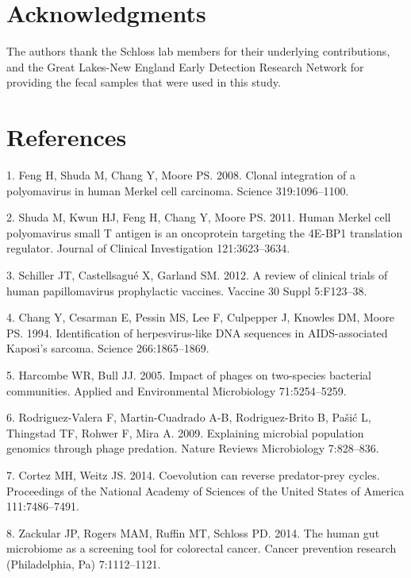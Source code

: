 \documentclass[12pt,]{article}
\begin{document}
\section{Acknowledgments}\label{acknowledgments}

The authors thank the Schloss lab members for their underlying
contributions, and the Great Lakes-New England Early Detection Research
Network for providing the fecal samples that were used in this study.

\newpage

\section{References}\label{references}

\hypertarget{refs}{}
\hypertarget{ref-Feng:2008kr}{}
1. Feng H, Shuda M, Chang Y, Moore PS. 2008. Clonal integration of a
polyomavirus in human Merkel cell carcinoma. Science 319:1096--1100.

\hypertarget{ref-Shuda:2011gf}{}
2. Shuda M, Kwun HJ, Feng H, Chang Y, Moore PS. 2011. Human Merkel cell
polyomavirus small T antigen is an oncoprotein targeting the 4E-BP1
translation regulator. Journal of Clinical Investigation 121:3623--3634.

\hypertarget{ref-Schiller:2012ba}{}
3. Schiller JT, Castellsagué X, Garland SM. 2012. A review of clinical
trials of human papillomavirus prophylactic vaccines. Vaccine 30 Suppl
5:F123--38.

\hypertarget{ref-Chang:1994up}{}
4. Chang Y, Cesarman E, Pessin MS, Lee F, Culpepper J, Knowles DM, Moore
PS. 1994. Identification of herpesvirus-like DNA sequences in
AIDS-associated Kaposi's sarcoma. Science 266:1865--1869.

\hypertarget{ref-Harcombe:2005fd}{}
5. Harcombe WR, Bull JJ. 2005. Impact of phages on two-species bacterial
communities. Applied and Environmental Microbiology 71:5254--5259.

\hypertarget{ref-RodriguezValera:2009cr}{}
6. Rodriguez-Valera F, Martin-Cuadrado A-B, Rodriguez-Brito B, Pašić L,
Thingstad TF, Rohwer F, Mira A. 2009. Explaining microbial population
genomics through phage predation. Nature Reviews Microbiology
7:828--836.

\hypertarget{ref-Cortez:2014bk}{}
7. Cortez MH, Weitz JS. 2014. Coevolution can reverse predator-prey
cycles. Proceedings of the National Academy of Sciences of the United
States of America 111:7486--7491.

\hypertarget{ref-Zackular:2014fba}{}
8. Zackular JP, Rogers MAM, Ruffin MT, Schloss PD. 2014. The human gut
microbiome as a screening tool for colorectal cancer. Cancer prevention
research (Philadelphia, Pa) 7:1112--1121.
\end{document}
